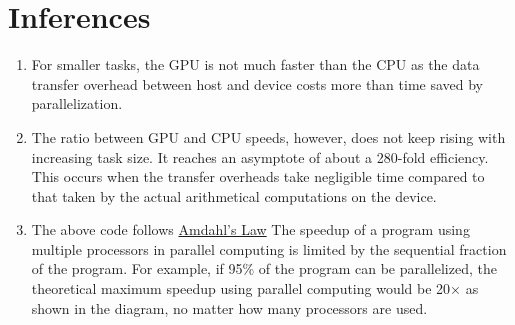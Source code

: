 \section{Inferences}
\begin{enumerate}
\item For smaller tasks, the GPU is not much faster than the CPU as the data transfer overhead between host and device costs more than time saved by parallelization.
\item The ratio between GPU and CPU speeds, however, does not keep rising with increasing task size. It reaches an asymptote of about a 280-fold efficiency. This occurs when the transfer overheads take negligible time compared to that taken by the actual arithmetical computations on the device.
\item The above code follows \href{http://en.wikipedia.org/wiki/Amdahl's_law}{Amdahl's Law} The speedup of a program using multiple processors in parallel computing is limited by the sequential fraction of the program. For example, if 95\% of the program can be parallelized, the theoretical maximum speedup using parallel computing would be 20× as shown in the diagram, no matter how many processors are used.
\end{enumerate}
